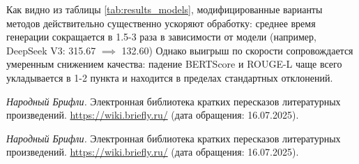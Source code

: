 \documentclass{article}
\theoremstyle{definition}
\theoremstyle{plain}
\begin{document}
Как видно из таблицы \ref{tab:results_models}, модифицированные варианты методов действительно существенно ускоряют обработку: среднее время генерации сокращается в 1.5-3 раза в зависимости от модели (например, DeepSeek V3: 315.67 $\implies$ 132.60)
Однако выигрыш по скорости сопровождается умеренным снижением качества: падение BERTScore и ROUGE-L чаще всего укладывается в 1-2 пункта и находится в пределах стандартных отклонений.



\begin{thebibliography}{99}
\textit{Народный Брифли.}  
Электронная библиотека кратких пересказов литературных произведений.  
\url{https://wiki.briefly.ru/} (дата обращения: 16.07.2025).

\end{thebibliography}

\renewcommand\refname{References}


\begin{thebibliography}{99}
\textit{Народный Брифли.}  
Электронная библиотека кратких пересказов литературных произведений.  
\url{https://wiki.briefly.ru/} (дата обращения: 16.07.2025).

\end{thebibliography}
\end{document}
